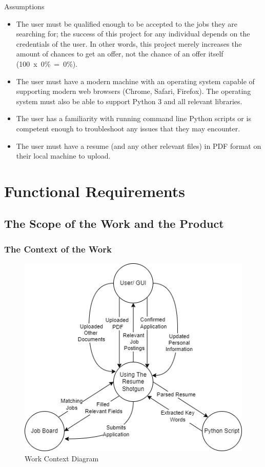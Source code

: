\documentclass[12pt, titlepage]{article}
\begin{document}
\noindent Assumptions
\begin{itemize}
\item The user must be qualified enough to be accepted to the jobs they are searching for; the success of this project for any individual depends on the credentials of the user. In other words, this project merely increases the amount of chances to get an offer, not the chance of an offer itself (100~x~0\%~=~0\%).
\item The user must have a modern machine with an operating system capable of supporting modern web browsers (Chrome, Safari, Firefox). The operating system must also be able to support Python 3 and all relevant libraries.
\item The user has a familiarity with running command line Python scripts or is competent enough to troubleshoot any issues that they may encounter.
\item The user must have a resume (and any other relevant files) in PDF format on their local machine to upload.
\end{itemize}

\section{Functional Requirements}

\subsection{The Scope of the Work and the Product}

\subsubsection{The Context of the Work}

\begin{figure}[ht]
    \centering
    \includegraphics[width=125mm,scale=0.5]{SRS_Diagrams/SRS_Context_3.png}
    \caption{Work Context Diagram}
    \label{fig:context}
\end{figure}
\end{document}
